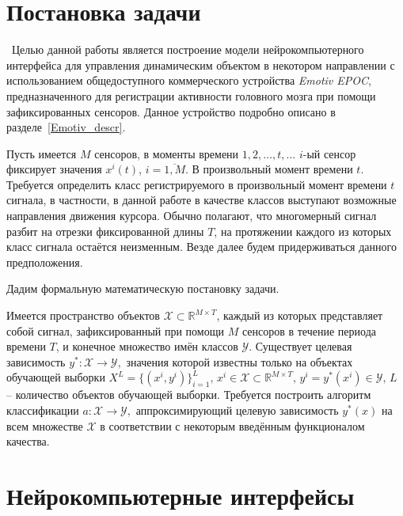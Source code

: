 \documentclass[12pt,a4paper,oneside,fleqn,leqno]{article}
\begin{document}
\clearpage 

\section{Постановка задачи}
	\quad\,\,\,Целью данной работы является построение модели нейрокомпьютерного интерфейса для управления динамическим объектом в некотором направлении с использованием общедоступного коммерческого устройства {\it Emotiv EPOC}, предназначенного для регистрации активности головного мозга при помощи зафиксированных сенсоров. Данное устройство подробно описано в разделе~\ref{Emotiv_descr}.
 	\par Пусть имеется $M$ сенсоров, в моменты времени $1, 2, \dots, t, \dots$ $i$-ый сенсор фиксирует значения $x^i(t)$, $i = \overline{1,M}.$ В произвольный момент времени $t$. Требуется определить класс регистрируемого в произвольный момент времени $t$ сигнала, в частности, в данной работе в качестве классов выступают возможные направления движения курсора. Обычно полагают, что многомерный сигнал разбит на отрезки фиксированной длины $T$, на протяжении каждого из которых класс сигнала остаётся неизменным. Везде далее будем придерживаться данного предположения.
	\par Дадим формальную математическую постановку задачи.
	\par Имеется пространство объектов $\mathcal{X} \subset \mathbb{R}^{M \times T}$, каждый из которых представляет собой сигнал, зафиксированный при помощи $M$ сенсоров в течение периода времени $T$, и конечное множество имён классов $\mathcal{Y}$. Существует целевая зависимость $y^*: \mathcal{X} \to \mathcal{Y},$ значения которой известны только на объектах обучающей выборки $X^L = \{ (x^i, y^i)\}_{i=1}^L, \, x^i \in \mathcal{X} \subset \mathbb{R}^{M \times T}, \, y^i = y^*(x^i) \in \mathcal{Y}, \, L$ -- количество объектов обучающей выборки. Требуется построить алгоритм классификации $a: \mathcal{X} \to \mathcal{Y},$ аппроксимирующий целевую зависимость $y^*(x)$ на всем множестве $\mathcal{X}$ в соответствии с некоторым введённым функционалом качества.

\clearpage 

\section{Нейрокомпьютерные интерфейсы}
\end{document}
